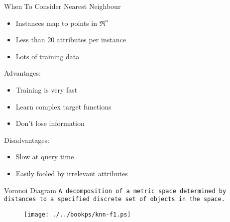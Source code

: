 \documentclass[%
pdf,
colorBG,
slideColor,
tcrico,
]{prosper}
\begin{document}

\begin{slide}{When To Consider Nearest Neighbour }
\tiny
\begin{itemize}
\item Instances map to points in $\Re^n$
\item Less than 20 attributes per instance
\item Lots of training data
\end{itemize}

Advantages:
\begin{itemize}
\item Training is very fast
\item Learn complex target functions
\item Don't lose information
\end{itemize}

Disadvantages:
\begin{itemize}
\item Slow at query time
\item Easily fooled by irrelevant attributes
\end{itemize}
\end{slide}


\begin{slide}{Voronoi Diagram }
\texttt{A decomposition of a metric space determined by distances to a specified discrete set of objects in the space.}
\begin{figure}
	\centering
	\texttt{[image: ./../bookps/knn-f1.ps]}
\end{figure}

\end{slide}

\end{document}
